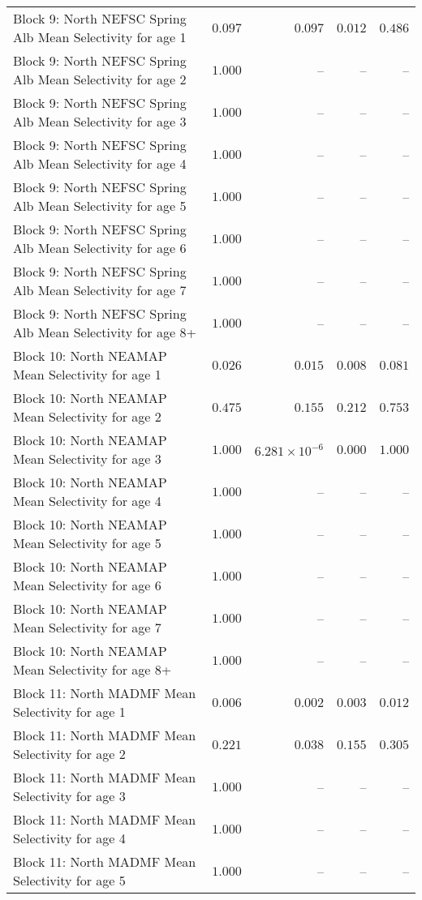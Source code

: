 \documentclass[
]{article}
\begin{document}
\begin{landscape}
\begin{longtable}[t]{lrrrr}
Block 9: North NEFSC Spring Alb Mean Selectivity for age 1 & $0.097$ & $0.097$ & $0.012$ & $0.486$\\
Block 9: North NEFSC Spring Alb Mean Selectivity for age 2 & $1.000$ & -- & -- & --\\
Block 9: North NEFSC Spring Alb Mean Selectivity for age 3 & $1.000$ & -- & -- & --\\
Block 9: North NEFSC Spring Alb Mean Selectivity for age 4 & $1.000$ & -- & -- & --\\
\addlinespace
Block 9: North NEFSC Spring Alb Mean Selectivity for age 5 & $1.000$ & -- & -- & --\\
Block 9: North NEFSC Spring Alb Mean Selectivity for age 6 & $1.000$ & -- & -- & --\\
Block 9: North NEFSC Spring Alb Mean Selectivity for age 7 & $1.000$ & -- & -- & --\\
Block 9: North NEFSC Spring Alb Mean Selectivity for age 8+ & $1.000$ & -- & -- & --\\
Block 10: North NEAMAP Mean Selectivity for age 1 & $0.026$ & $0.015$ & $0.008$ & $0.081$\\
\addlinespace
Block 10: North NEAMAP Mean Selectivity for age 2 & $0.475$ & $0.155$ & $0.212$ & $0.753$\\
Block 10: North NEAMAP Mean Selectivity for age 3 & $1.000$ & $6.281\times 10^{-6}$ & $0.000$ & $1.000$\\
Block 10: North NEAMAP Mean Selectivity for age 4 & $1.000$ & -- & -- & --\\
Block 10: North NEAMAP Mean Selectivity for age 5 & $1.000$ & -- & -- & --\\
Block 10: North NEAMAP Mean Selectivity for age 6 & $1.000$ & -- & -- & --\\
\addlinespace
Block 10: North NEAMAP Mean Selectivity for age 7 & $1.000$ & -- & -- & --\\
Block 10: North NEAMAP Mean Selectivity for age 8+ & $1.000$ & -- & -- & --\\
Block 11: North MADMF Mean Selectivity for age 1 & $0.006$ & $0.002$ & $0.003$ & $0.012$\\
Block 11: North MADMF Mean Selectivity for age 2 & $0.221$ & $0.038$ & $0.155$ & $0.305$\\
Block 11: North MADMF Mean Selectivity for age 3 & $1.000$ & -- & -- & --\\
\addlinespace
Block 11: North MADMF Mean Selectivity for age 4 & $1.000$ & -- & -- & --\\
Block 11: North MADMF Mean Selectivity for age 5 & $1.000$ & -- & -- & --\\

\end{longtable}
\end{landscape}
\end{document}
